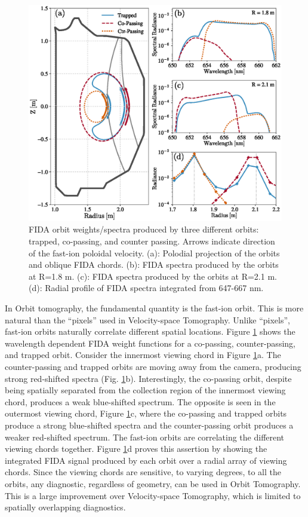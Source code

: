\begin{figure}[h!]
    \centering
    \includegraphics[width=15cm]{figures/orbit_fida_spectra.eps}
    \caption{FIDA orbit weights/spectra produced by three different orbits: trapped, co-passing, and counter passing. Arrows indicate direction of the fast-ion poloidal velocity. (a): Polodial projection of the orbits and oblique FIDA chords. (b): FIDA spectra produced by the orbits at R=1.8 m. (c): FIDA spectra produced by the orbits at R=2.1 m. (d): Radial profile of FIDA spectra integrated from 647-667 nm.}
    \label{fig:orbit_fida_spectra}
\end{figure}
In Orbit tomography, the fundamental quantity is the fast-ion orbit. This is more natural than the ``pixels'' used in Velocity-space Tomography. Unlike ``pixels'', fast-ion orbits naturally correlate different spatial locations.
Figure \ref{fig:orbit_fida_spectra} shows the wavelength dependent FIDA weight functions for a co-passing, counter-passing, and trapped orbit. Consider the innermost viewing chord in Figure \ref{fig:orbit_fida_spectra}a. The counter-passing and trapped orbits are moving away from the camera, producing strong red-shifted spectra (Fig. \ref{fig:orbit_fida_spectra}b). Interestingly, the co-passing orbit, despite being spatially separated from the collection region of the innermost viewing chord, produces a weak blue-shifted spectrum. The opposite is seen in the outermost viewing chord, Figure \ref{fig:orbit_fida_spectra}c, where the co-passing and trapped orbits produce a strong blue-shifted spectra and the counter-passing orbit produces a weaker red-shifted spectrum. The fast-ion orbits are correlating the different viewing chords together. Figure \ref{fig:orbit_fida_spectra}d proves this assertion by showing the integrated FIDA signal produced by each orbit over a radial array of viewing chords. Since the viewing chords are sensitive, to varying degrees, to all the orbits, any diagnostic, regardless of geometry, can be used in Orbit Tomography. This is a large improvement over Velocity-space Tomography, which is limited to spatially overlapping diagnostics. 

